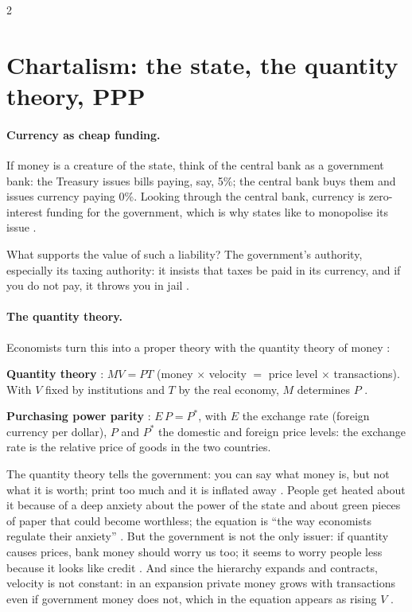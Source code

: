 \begin{paracol}{2}
\section{Chartalism: the state, the quantity theory, PPP}\label{sec:cm-chartalist}

\paragraph{Currency as cheap funding.} If money is a creature of the state, think of the central bank as a government bank: the Treasury issues bills paying, say, 5\%;
the central bank buys them and issues currency paying 0\%. Looking through the central bank, currency is zero-interest funding for the government, which is why states
like to monopolise its issue .
\begin{taccts}
\qquad
{}
\end{taccts}
What supports the value of such a liability? The government's authority, especially its taxing authority: it insists that taxes be paid in its currency, and if you
do not pay, it throws you in jail .

\paragraph{The quantity theory.} Economists turn this into a proper theory with the quantity theory of money :
\begin{keyformulas}
\textbf{Quantity theory} : $MV = PT$ (money $\times$ velocity $=$ price level $\times$ transactions). With $V$ fixed by institutions and $T$ by the
real economy, $M$ determines $P$ .

\medskip
\textbf{Purchasing power parity} : $E\,P = P^\ast$, with $E$ the exchange rate (foreign currency per dollar), $P$ and $P^\ast$ the domestic
and foreign price levels: the exchange rate is the relative price of goods in the two countries.
\end{keyformulas}
The quantity theory tells the government: you can say what money is, but not what it is worth; print too much and it is inflated away . People get
heated about it because of a deep anxiety about the power of the state and about green pieces of paper that could become worthless; the equation is ``the way economists
regulate their anxiety'' . But the government is not the only issuer: if quantity causes prices, bank money should worry us too; it
seems to worry people less because it looks like credit . And since the hierarchy expands and contracts, velocity is not constant: in an
expansion private money grows with transactions even if government money does not, which in the equation appears as rising $V$ .


\end{paracol}
